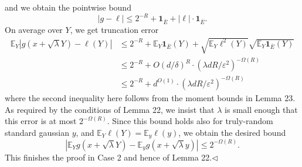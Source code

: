 \documentclass[10pt,a4paper]{article}
\begin{document}
and we obtain the pointwise bound
\[|g-\ell|\leq2^{-R}+\boldsymbol1_{\overline E}+|\ell|\cdot\boldsymbol1_{\overline E}.\]
On average over $Y$, we get truncation error
\begin{align*}
\mathbb E_Y|g(x+\sqrt\lambda Y)-\ell(Y)|
&\leq2^{-R}+\mathbb E_Y\boldsymbol1_{\overline E}(Y)+\sqrt{\mathbb E_Y\ell^2(Y)}\sqrt{\mathbb E_Y\boldsymbol1_{\overline E}(Y)}\\
&\leq2^{-R}+O(d/\delta)^R\cdot(\lambda dR/\varepsilon^2)^{-\Omega(R)}\\
&\leq2^{-R}+d^{O(1)}\cdot(\lambda dR/\varepsilon^2)^{-\Omega(R)}
\end{align*}
where the second inequality here follows from the moment bounds in Lemma 23. As required by the conditions of Lemma 22, we insist that $\lambda$ is small enough that this error is at most $2^{-\Omega(R)}$. Since this bound holds also for truly-random standard gaussian $y$, and $\mathbb E_Y\ell(Y)=\mathbb E_y\ell(y)$, we obtain the desired bound
\[|\mathbb E_Yg(x+\sqrt\lambda Y)-\mathbb E_yg(x+\sqrt\lambda y)|\leq2^{-\Omega(R)}.\]
This finishes the proof in Case 2 and hence of Lemma 22.\hfill$\triangleleft$
\end{document}
